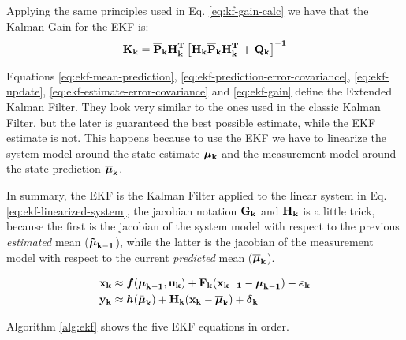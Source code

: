 \documentclass[12pt]{article}
\begin{document}
Applying the same principles used in Eq. \ref{eq:kf-gain-calc} we
have that the Kalman Gain for the EKF is:
\begin{equation}
    \boldsymbol{\mathbf{K_k}} = \boldsymbol{\mathbf{\overline{P}_k H_k^T}}\left[\boldsymbol{\mathbf{H_k 
    \overline{P}_k H_k^T + Q_k}}\right]^\mathbf{-1}
    \label{eq:ekf-gain}
\end{equation}

Equations \ref{eq:ekf-mean-prediction}, 
\ref{eq:ekf-prediction-error-covariance}, \ref{eq:ekf-update},
\ref{eq:ekf-estimate-error-covariance} and \ref{eq:ekf-gain}
define the Extended Kalman Filter. They look very similar to the ones
used in the classic Kalman Filter, but the later is guaranteed
the best possible estimate, while the EKF estimate is not. This happens
because to use the EKF we have to linearize the system model around the state 
estimate $\boldsymbol{\mathbf{\mu_k}}$ and  the measurement model around the state prediction 
$\boldsymbol{\mathbf{\overline{\mu}_k}}$. 

In summary, the EKF is the Kalman Filter applied to the linear system in 
Eq. \ref{eq:ekf-linearized-system}, the jacobian notation $\boldsymbol{\mathbf{G_k}}$ and 
$\boldsymbol{\mathbf{H_k}}$ is a little trick, because the first is the jacobian of the 
system model with respect to the previous \emph{estimated} mean 
(${\boldsymbol{\tilde\mu}}_\mathbf{k-1}$), while the latter is the jacobian 
of the measurement model with respect to the current \emph{predicted} 
mean ($\boldsymbol{\mathbf{\overline{\mu}_k}}$).

\begin{equation}
    \begin{aligned}
        \boldsymbol{\mathbf{x_k}} &\approx {\boldsymbol{f}}({\boldsymbol{\mu}}_\mathbf{k-1}, \boldsymbol{\mathbf{u_k}}) + 
        \boldsymbol{\mathbf{F_k}} (\boldsymbol{\mathbf{x_{k-1}}} - {\boldsymbol{\mu}}_\mathbf{k-1}) + 
        {\boldsymbol{\varepsilon}}_\mathbf{k}\\
        \boldsymbol{\mathbf{y_k}} &\approx {\boldsymbol{h}}(\bar{{\boldsymbol{\mu}}}_\mathbf{k}) + \boldsymbol{\mathbf{H_k}} 
        (\boldsymbol{\mathbf{x_k}} - {\boldsymbol{\overline{\mu}}}_\mathbf{k}) + {\boldsymbol{\delta}}_\mathbf{k}\\
    \end{aligned}
    \label{eq:ekf-linearized-system}
\end{equation}

Algorithm \ref{alg:ekf} shows the five EKF equations in order.
\end{document}
